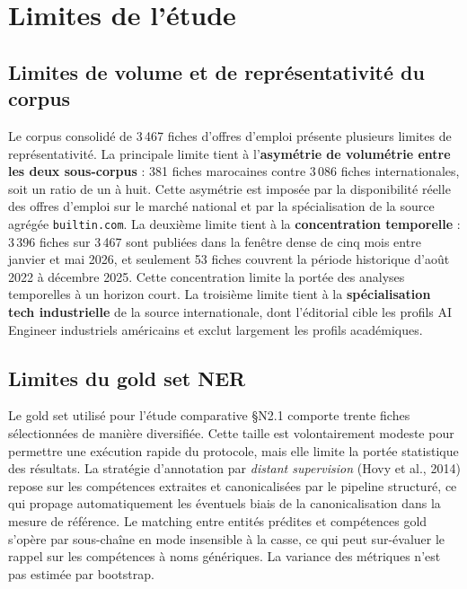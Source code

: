 \documentclass[11pt,a4paper,openany]{report}
\begin{document}
\section{Limites de l'\'etude}

\subsection{Limites de volume et de repr\'esentativit\'e du corpus}

Le corpus consolid\'e de 3\,467 fiches d'offres d'emploi pr\'esente plusieurs limites de repr\'esentativit\'e. La principale limite tient \`a l'\textbf{asym\'etrie de volum\'etrie entre les deux sous-corpus} : 381 fiches marocaines contre 3\,086 fiches internationales, soit un ratio de un \`a huit. Cette asym\'etrie est impos\'ee par la disponibilit\'e r\'eelle des offres d'emploi sur le march\'e national et par la sp\'ecialisation de la source agr\'eg\'ee \texttt{builtin.com}. La deuxi\`eme limite tient \`a la \textbf{concentration temporelle} : 3\,396 fiches sur 3\,467 sont publi\'ees dans la fen\^etre dense de cinq mois entre janvier et mai 2026, et seulement 53 fiches couvrent la p\'eriode historique d'ao\^ut 2022 \`a d\'ecembre 2025. Cette concentration limite la port\'ee des analyses temporelles \`a un horizon court. La troisi\`eme limite tient \`a la \textbf{sp\'ecialisation tech industrielle} de la source internationale, dont l'\'editorial cible les profils AI Engineer industriels am\'ericains et exclut largement les profils acad\'emiques.

\subsection{Limites du gold set NER}

Le gold set utilis\'e pour l'\'etude comparative \S N2.1 comporte trente fiches s\'electionn\'ees de mani\`ere diversifi\'ee. Cette taille est volontairement modeste pour permettre une ex\'ecution rapide du protocole, mais elle limite la port\'ee statistique des r\'esultats. La strat\'egie d'annotation par \emph{distant supervision} (Hovy et al., 2014) repose sur les comp\'etences extraites et canonicalis\'ees par le pipeline structur\'e, ce qui propage automatiquement les \'eventuels biais de la canonicalisation dans la mesure de r\'ef\'erence. Le matching entre entit\'es pr\'edites et comp\'etences gold s'op\`ere par sous-cha\^ine en mode insensible \`a la casse, ce qui peut sur-\'evaluer le rappel sur les comp\'etences \`a noms g\'en\'eriques. La variance des m\'etriques n'est pas estim\'ee par bootstrap.
\end{document}
